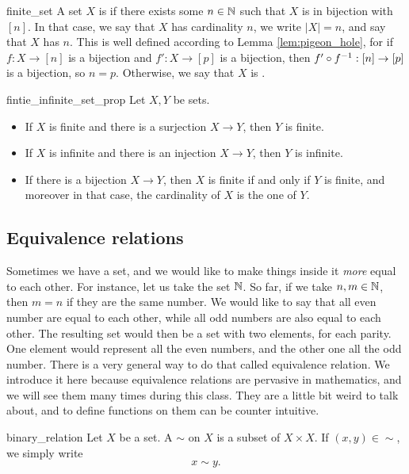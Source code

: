 \begin{cdef}{}{finite_set}
    A set \( X \) is  if there exists some \( n \in \mathbb{N} \) such that \( X \) is in bijection with \( [n] \). In that case, we say that \( X \) has cardinality \( n \), we write \( |X| = n \), and say that \( X \) has  \( n \). This is well defined according to Lemma \ref{lem:pigeon_hole}, for if \( f : X \to [n] \) is a bijection and \( f' :  X \to [p] \) is a bijection, then \( f' \circ {f}^{-1} : [n] \to [p]  \) is a bijection, so \( n = p \). 
    Otherwise, we say that \( X \) is .
\end{cdef}


\begin{cexp}{}{fintie_infinite_set_prop}
    Let \( X, Y \) be sets. 
    \begin{itemize}
        \item If \( X \) is finite and there is a surjection \( X \to Y \), then \( Y \) is finite.
        \item If \( X \) is infinite and there is an injection \( X \to Y \), then \( Y \) is infinite.
        \item If there is a bijection \( X \to Y \), then \( X \) is finite if and only if \( Y \) is finite, and moreover in that case, the cardinality of \( X \) is the one of \( Y \).
    \end{itemize}  
\end{cexp}
\subsection{Equivalence relations}

Sometimes we have a set, and we would like to make things inside it \textit{more} equal to each other. For instance, let us take the set \( \mathbb{N} \). So far, if we take \( n, m \in \mathbb{N} \), then \( m = n \) if they are the same number. We would like to say that all even number are equal to each other, while all odd numbers are also equal to each other. The resulting set would then be a set with two elements, for each parity. One element would represent all the even numbers, and the other one all the odd number. There is a very general way to do that called equivalence relation. We introduce it here because equivalence relations are pervasive in mathematics, and we will see them many times during this class. They are a little bit weird to talk about, and to define functions on them can be counter intuitive. 

\begin{cdef}{}{binary_relation}
    Let \( X \) be a set. A  \( \sim \) on \( X \) is a subset of \( X \times X \). If \( (x, y) \in \sim \), we simply write
    \begin{equation*}
        x \sim y.
    \end{equation*} 
\end{cdef}

